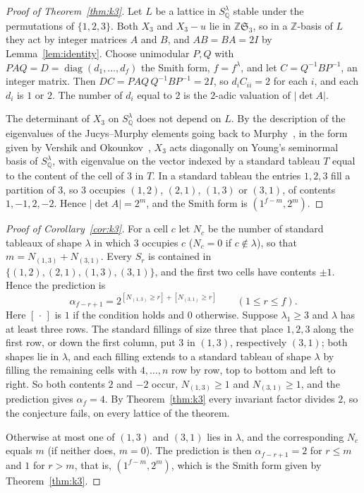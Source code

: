 \documentclass[11pt]{article}
\theoremstyle{remark}
\newcommand{\Z}{\mathbb{Z}}
\newcommand{\Q}{\mathbb{Q}}
\begin{document}
\begin{proof}[Proof of Theorem~\ref{thm:k3}]
Let $L$ be a lattice in $S^\lambda_\Q$ stable under the permutations of
$\{1,2,3\}$. Both $X_3$ and $X_3-u$ lie in $\Z\mathfrak{S}_3$, so in a
$\Z$-basis of $L$ they act by integer matrices $A$ and $B$, and
$AB=BA=2I$ by Lemma~\ref{lem:identity}. Choose unimodular $P,Q$ with
$PAQ=D=\operatorname{diag}(d_1,\dots,d_f)$ the Smith form, $f=f^\lambda$, and
let $C=Q^{-1}BP^{-1}$, an integer matrix. Then $DC=PAQ\,Q^{-1}BP^{-1}=2I$, so
$d_iC_{ii}=2$ for each $i$, and each $d_i$ is $1$ or $2$. The
number of $d_i$ equal to $2$ is the $2$-adic valuation of $|\det A|$.

The determinant of $X_3$ on $S^\lambda_\Q$ does not depend on $L$. By the description of the eigenvalues of the Jucys--Murphy elements going back to Murphy~\cite{murphy}, in the form given by Vershik and Okounkov~\cite[Theorem~5.8]{vo}, $X_3$ acts
diagonally on Young's seminormal basis of $S^\lambda_\Q$, with eigenvalue on
the vector indexed by a standard tableau $T$ equal to the content of the
cell of $3$ in $T$. In a standard tableau the entries $1,2,3$ fill a
partition of $3$, so $3$ occupies $(1,2)$, $(2,1)$, $(1,3)$ or $(3,1)$, of
contents $1,-1,2,-2$. Hence $|\det A|=2^m$, and the Smith form is
$(1^{f-m},2^m)$.
\end{proof}

\begin{proof}[Proof of Corollary~\ref{cor:k3}]
For a cell $c$ let $N_c$ be the number of standard tableaux of shape
$\lambda$ in which $3$ occupies $c$ ($N_c=0$ if $c\notin\lambda$), so that
$m=N_{(1,3)}+N_{(3,1)}$. Every $S_r$ is contained in
$\{(1,2),(2,1),(1,3),(3,1)\}$, and the first two cells have contents $\pm1$.
Hence the prediction is
\[
\alpha_{f-r+1}=2^{[N_{(1,3)}\ge r]+[N_{(3,1)}\ge r]}\qquad(1\le r\le f).
\]
Here $[\,\cdot\,]$ is $1$ if the condition holds and $0$ otherwise.
Suppose $\lambda_1\ge3$ and $\lambda$ has at least three rows. The standard
fillings of size three that place $1,2,3$ along the first row, or down the
first column, put $3$ in $(1,3)$, respectively $(3,1)$; both shapes lie in
$\lambda$, and each filling extends to a standard tableau of shape $\lambda$
by filling the remaining cells with $4,\dots,n$ row by row, top to bottom
and left to right. So both contents $2$ and $-2$ occur, $N_{(1,3)}\ge1$ and
$N_{(3,1)}\ge1$, and the prediction gives $\alpha_f=4$. By
Theorem~\ref{thm:k3} every invariant factor divides $2$, so the conjecture
fails, on every lattice of the theorem.

Otherwise at most one of $(1,3)$ and $(3,1)$ lies in $\lambda$, and the
corresponding $N_c$ equals $m$ (if neither does, $m=0$). The prediction is
then $\alpha_{f-r+1}=2$ for $r\le m$ and $1$ for $r>m$, that is,
$(1^{f-m},2^m)$, which is the Smith form given by Theorem~\ref{thm:k3}.
\end{proof}
\end{document}
